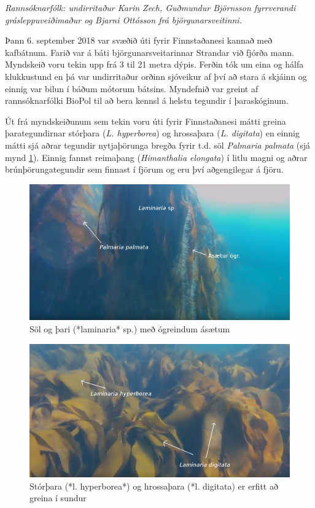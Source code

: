 \documentclass[icelandic,]{book}
\begin{document}
\emph{Rannsóknarfólk: undirritaður Karin Zech, Guðmundur Björnsson fyrrverandi grásleppuveiðimaður og Bjarni Ottósson frá björgunarsveitinni.}

Þann 6. september 2018 var svæðið úti fyrir Finnstaðanesi kannað með kafbátnum. Farið var á báti björgunarsveitarinnar Strandar við fjórða mann. Myndskeið voru tekin upp frá 3 til 21 metra dýpis. Ferðin tók um eina og hálfa klukkustund en þá var undirritaður orðinn sjóveikur af því að stara á skjáinn og einnig var bilun í báðum mótorum bátsins. Myndefnið var greint af rannsóknarfólki BioPol til að bera kennsl á helstu tegundir í þaraskóginum.

Út frá myndskeiðunum sem tekin voru úti fyrir Finnstaðanesi mátti greina þarategundirnar stórþara (\emph{L. hyperborea}) og hrossaþara (\emph{L. digitata}) en einnig mátti sjá aðrar tegundir nytjaþörunga bregða fyrir t.d. söl \emph{Palmaria palmata} (sjá mynd \ref{fig:thari}). Einnig fannst reimaþang (\emph{Himanthalia elongata}) í litlu magni og aðrar brúnþörungategundir sem finnast í fjörum og eru því aðgengilegar á fjöru.

\begin{figure}

{\centering \includegraphics[width=1\linewidth]{myndir/bettina/Laminaria-Palmaria-epiphytes} 

}

\caption{Söl og þari (*laminaria* sp.) með ógreindum ásætum}\label{fig:thari}
\end{figure}

\begin{figure}

{\centering \includegraphics[width=1\linewidth]{myndir/bettina/Laminaria} 

}

\caption{Stórþara (*l. hyperborea*) og hrossaþara (*l. digitata) er erfitt að greina í sundur}\label{fig:tharieitt}
\end{figure}
\end{document}
